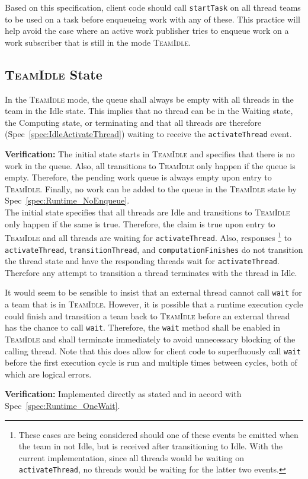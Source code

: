 \documentclass{article}
\newcommand{\TeamIdle}          {\textsc{TeamIdle}}
\begin{document}
Based on this specification, client code should call \texttt{startTask} on all
thread teams to be used on a task before enqueueing work with any of these.  This
practice will help avoid the case where an active work publisher tries to
enqueue work on a work subscriber that is still in the mode \TeamIdle.

\subsection{{\TeamIdle} State}
\begin{spec}
In the {\TeamIdle} mode, the queue shall always be empty with all threads in the
team in the Idle state.  This implies that no thread can be in the Waiting
state, the Computing state, or terminating and that all threads are therefore
(Spec~\ref{spec:IdleActivateThread}) waiting to receive the
\texttt{activateThread} event.
\end{spec}
\textbf{Verification:}\hspace{0.125in}  The initial state starts in {\TeamIdle}
and specifies that there is no work in the queue.  Also, all transitions to
{\TeamIdle} only happen if the queue is empty.  Therefore, the pending work
queue is always empty upon entry to \TeamIdle.  Finally, no work can be added to
the queue in the {\TeamIdle} state by Spec~\ref{spec:Runtime_NoEnqueue}.\\

The initial state specifies that all threads are Idle and transitions to
{\TeamIdle} only happen if the same is true.  Therefore, the claim is true upon
entry to {\TeamIdle} and all threads are waiting for \texttt{activateThread}.
Also, responses
\footnote{These cases are being considered should one of these
events be emitted when the team in not Idle, but is received after transitioning
to Idle.  With the current implementation, since all threads would be waiting on
\texttt{activateThread}, no threads would be waiting for the latter two events.}
to \texttt{activateThread}, \texttt{transitionThread}, and
\texttt{computationFinishes} do not transition the thread state and have the
responding threads wait for \texttt{activateThread}.  Therefore any attempt to
transition a thread terminates with the thread in Idle.

\begin{spec}
It would seem to be sensible to insist that an external thread cannot call
\texttt{wait} for a team that is in \TeamIdle.  However, it is possible that a
runtime execution cycle could finish and transition a team back to {\TeamIdle}
before an external thread has the chance to call \texttt{wait}.  Therefore, the
\texttt{wait} method shall be enabled in {\TeamIdle} and shall terminate immediately to avoid
unnecessary blocking of the calling thread.  Note that this does allow for
client code to superfluously call \texttt{wait} before the first execution cycle
is run and multiple times between cycles, both of which are logical errors.
\end{spec}
\textbf{Verification:}\hspace{0.125in}  Implemented directly as stated and in
accord with Spec~\ref{spec:Runtime_OneWait}.  
\end{document}
